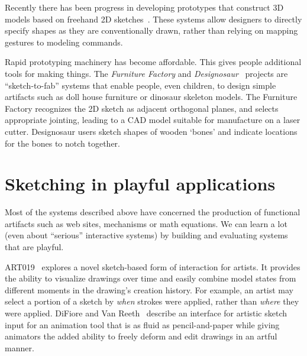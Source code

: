 Recently there has been progress in developing prototypes that
construct 3D models based on freehand 2D
sketches~\cite{lipson-correlation,masry-3d-sketch}. These systems
allow designers to directly specify shapes as they are conventionally
drawn, rather than relying on mapping gestures to modeling commands.

Rapid prototyping machinery has become affordable. This gives people
additional tools for making things. The \textit{Furniture Factory}
and \textit{Designosaur}~\cite{oh-fab} projects are ``sketch-to-fab''
systems that enable people, even children, to design simple artifacts
such as doll house furniture or dinosaur skeleton models. The
Furniture Factory recognizes the 2D sketch as adjacent orthogonal
planes, and selects appropriate jointing, leading to a CAD model
suitable for manufacture on a laser cutter. Designosaur users sketch
shapes of wooden `bones' and indicate locations for the bones to notch
together.

\section{Sketching in playful applications}

Most of the systems described above have concerned the production of
functional artifacts such as web sites, mechanisms or math
equations. We can learn a lot (even about ``serious'' interactive
systems) by building and evaluating systems that are playful.

ART019~\cite{yamamoto-art019} explores a novel sketch-based form of
interaction for artists. It provides the ability to visualize drawings
over time and easily combine model states from different moments in
the drawing's creation history. For example, an artist may select a
portion of a sketch by \textit{when} strokes were applied, rather
than \textit{where} they were applied. DiFiore and Van
Reeth~\cite{difiore-sketching-artistic} describe an interface for
artistic sketch input for an animation tool that is as fluid as
pencil-and-paper while giving animators the added ability to freely
deform and edit drawings in an artful manner.

